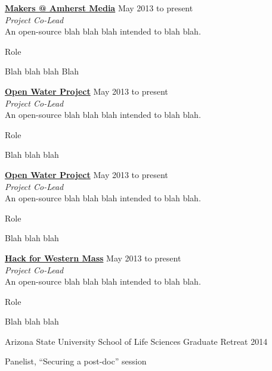 \documentclass[10pt]{article}
\newcommand{\halfblankline}{\quad\vspace{-0.5\baselineskip}\pagebreak[3]}
\begin{document}
\href{http://open-eie.io}{\textbf{Makers @ Amherst Media}} \hfill {May 2013 to present} \\
\emph{Project Co-Lead} \\
An open-source blah blah blah intended to blah blah.
    \begin{innerlist}
        \item Role
        \item Blah blah blah Blah 

\end{innerlist}

\halfblankline

\href{http://openwaterproject.io}{\textbf{Open Water Project}} \hfill {May 2013 to present} \\
\emph{Project Co-Lead} \\
An open-source blah blah blah intended to blah blah.
    \begin{innerlist}
        \item Role
        \item Blah blah blah 

\end{innerlist}

\halfblankline

\href{http://openwaterproject.io}{\textbf{Open Water Project}} \hfill {May 2013 to present} \\
\emph{Project Co-Lead} \\
An open-source blah blah blah intended to blah blah.
    \begin{innerlist}
        \item Role
        \item Blah blah blah 

\end{innerlist}

\halfblankline

\href{http://openwaterproject.io}{\textbf{Hack for Western Mass}} \hfill {May 2013 to present} \\
\emph{Project Co-Lead} \\
An open-source blah blah blah intended to blah blah.
    \begin{innerlist}
        \item Role
        \item Blah blah blah 

\end{innerlist}

\halfblankline


Arizona State University School of Life Sciences Graduate Retreat 2014
\begin{innerlist}
    \item Panelist, ``Securing a post-doc'' session
\end{innerlist}
\end{document}
